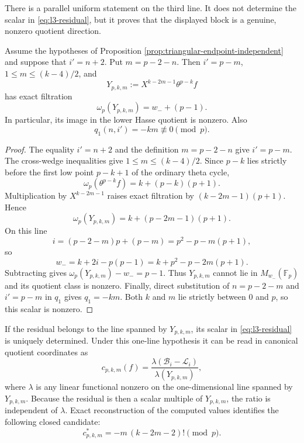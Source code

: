 There is a parallel uniform statement on the third line.  It does not
determine the scalar in \eqref{eq:l3-residual}, but it proves that the
displayed block is a genuine, nonzero quotient direction.

\begin{proposition}
\label{prop:l3-block-nonzero}
Assume the hypotheses of Proposition
\ref{prop:triangular-endpoint-independent} and suppose that $i'=n+2$.
Put $m=p-2-n$.  Then $i'=p-m$, $1\leq m\leq(k-4)/2$, and
\[
 Y_{p,k,m}:=X^{k-2m-1}\theta^{p-k}f
\]
has exact filtration
\[
 \omega_p(Y_{p,k,m})=w_-+(p-1).
\]
In particular, its image in the lower Hasse quotient is nonzero.  Also
\[
 q_1(n,i')=-km\not\equiv0\pmod p.
\]
\end{proposition}

\begin{proof}
The equality $i'=n+2$ and the definition $m=p-2-n$ give $i'=p-m$.
The cross-wedge inequalities give $1\leq m\leq(k-4)/2$.  Since
$p-k$ lies strictly before the first low point $p-k+1$ of the ordinary
theta cycle,
\[
 \omega_p(\theta^{p-k}f)=k+(p-k)(p+1).
\]
Multiplication by $X^{k-2m-1}$ raises exact filtration by
$(k-2m-1)(p+1)$.  Hence
\[
 \omega_p(Y_{p,k,m})
 =k+(p-2m-1)(p+1).
\]
On this line
\[
 i=(p-2-m)p+(p-m)=p^2-p-m(p+1),
\]
so
\[
 w_-=k+2i-p(p-1)=k+p^2-p-2m(p+1).
\]
Subtracting gives $\omega_p(Y_{p,k,m})-w_-=p-1$.  Thus
$Y_{p,k,m}$ cannot lie in $M_{w_-}(\mathbb F_p)$ and its quotient class
is nonzero.  Finally, direct substitution of $n=p-2-m$ and $i'=p-m$ in
$q_1$ gives $q_1=-km$.  Both $k$ and $m$ lie strictly between $0$ and
$p$, so this scalar is nonzero.
\end{proof}

If the residual belongs to the line spanned by $Y_{p,k,m}$, its scalar in
\eqref{eq:l3-residual} is uniquely determined.  Under this one-line
hypothesis it can be read in canonical quotient coordinates as
\begin{equation}\label{eq:l3-scalar-definition}
 c_{p,k,m}(f)=
 \frac{\lambda(\mathcal B_i-\mathcal L_i)}
      {\lambda(Y_{p,k,m})},
\end{equation}
where $\lambda$ is any linear functional nonzero on the one-dimensional
line spanned by $Y_{p,k,m}$.  Because the residual is then a scalar multiple
of $Y_{p,k,m}$, the ratio is independent of $\lambda$.  Exact
reconstruction of the computed values identifies the following closed
candidate:
\begin{equation}\label{eq:l3-closed-scalar}
 c^*_{p,k,m}=-m\,(k-2m-2)!\pmod p.
\end{equation}

